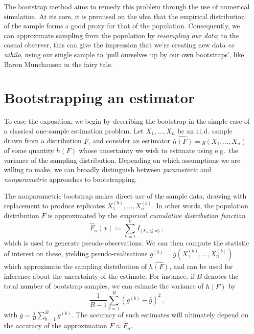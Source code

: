\documentclass[a4paper]{book}
\begin{document}
The bootstrap method aims to remedy this problem through the use of numerical simulation. At its core, it is premised on the idea that the empirical distribution of the sample forms a good proxy for that of the population. Consequently, we can approximate sampling from the population by \emph{resampling our data}; to the casual observer, this can give the impression that we're creating new data \emph{ex nihilo}, using our single sample to `pull ourselves up by our own bootstraps', like Baron Munchausen in the fairy tale.

\section{Bootstrapping an estimator}

To ease the exposition, we begin by describing the bootstrap in the simple case of a classical one-sample estimation problem. Let $X_1, \dots, X_n$ be an i.i.d. sample drawn from a distribution $F$, and consider an estimator $\widehat{h(F)} = g(X_1, \dots, X_n)$ of some quantity $h(F)$ whose uncertainty we wish to estimate using e.g.\ the variance of the sampling distribution. Depending on which assumptions we are willing to make, we can broadly distinguish between \emph{parameteric} and \emph{nonparametric} approaches to bootstrapping.

The nonparametric bootstrap makes direct use of the sample data, drawing with replacement to produce replicates $X^{(b)}_1, \dots, X^{(b)}_n$. In other words, the population distribution $F$ is approximated by the \emph{empirical cumulative distribution function}
\begin{equation}
  \widehat{F}_n(x) \coloneqq \sum_{k=1}^n I_{\{ X_k \leq x \}} \,,
\end{equation}
which is used to generate pseudo-observations. We can then compute the statistic of interest on these, yielding pseudo-realisations $g^{(b)} = g(X^{(b)}_1, \dots, X^{(b)}_n)$ which approximate the sampling distribution of $\widehat{h(F)}$, and can be used for inference about the uncertainty of the estimate. For instance, if $B$ denotes the total number of bootstrap samples, we can esimate the variance of $\widehat{h(F)}$ by
\begin{equation}
  \frac{1}{B-1}\sum_{b=1}^B(g^{(b)} - \bar{g})^2 \,,
\end{equation}
with $\bar{g} = \frac{1}{B} \sum_{b=1}^B g^{(b)}$. The accuracy of such estimates will ultimately depend on the accuracy of the approximation $F \approx \widehat{F}_n$.
\end{document}
